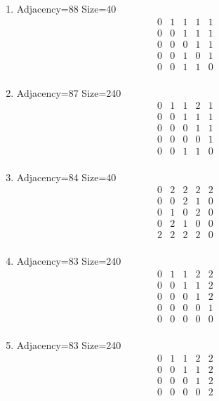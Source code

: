 \documentclass[12pt]{article}
\begin{document}
\begin{multicols}{3}
\begin{enumerate}
\item Adjacency=88 Size=40
\begin{equation*}
\begin{array}{ccccc}
0&1&1&1&1\\
0&0&1&1&1\\
0&0&0&1&1\\
0&0&1&0&1\\
0&0&1&1&0\\
\end{array}
\end{equation*}
\item Adjacency=87 Size=240
\begin{equation*}
\begin{array}{ccccc}
0&1&1&2&1\\
0&0&1&1&1\\
0&0&0&1&1\\
0&0&0&0&1\\
0&0&1&1&0\\
\end{array}
\end{equation*}
\item Adjacency=84 Size=40
\begin{equation*}
\begin{array}{ccccc}
0&2&2&2&2\\
0&0&2&1&0\\
0&1&0&2&0\\
0&2&1&0&0\\
2&2&2&2&0\\
\end{array}
\end{equation*}
\item Adjacency=83 Size=240
\begin{equation*}
\begin{array}{ccccc}
0&1&1&2&2\\
0&0&1&1&2\\
0&0&0&1&2\\
0&0&0&0&1\\
0&0&0&0&0\\
\end{array}
\end{equation*}
\item Adjacency=83 Size=240
\begin{equation*}
\begin{array}{ccccc}
0&1&1&2&2\\
0&0&1&1&2\\
0&0&0&1&2\\
0&0&0&0&2\\

\end{array}
\end{equation*}
\end{enumerate}
\end{multicols}
\end{document}

